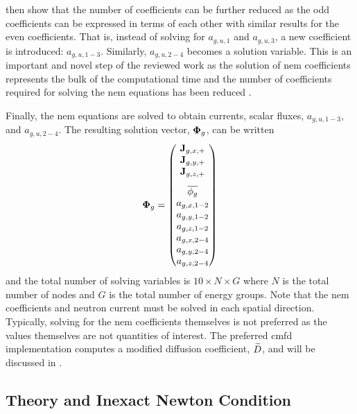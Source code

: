     \citeauthor{qe2paper} then show that the number of coefficients can be
    further reduced as the odd coefficients can be expressed in terms of
    each other with similar results for the even coefficients. That is,
    instead of solving for $a_{g,u,1}$ and $a_{g,u,3}$, a new coefficient is
    introduced: $a_{g,u,1-3}$. Similarly, $a_{g,u,2-4}$ becomes a solution
    variable. This is an important and novel step of the reviewed work as the
    solution of \gls{nem} coefficients represents the bulk of the
    computational time and the number of coefficients required for solving the
    \gls{nem} equations has been reduced \cite{qe2paper}.

    Finally, the \gls{nem} equations are solved to obtain currents, scalar
    fluxes, $a_{g,u,1-3}$, and $a_{g,u,2-4}$. The resulting solution vector,
    $\mathbf{\Phi}_g$, can be written 
    \begin{equation}
      \label{eq:solution_vector}
      \vPhi_g =
      \begin{pmatrix}
        \current_{g,x,+} \\
        \current_{g,y,+} \\
        \vspace{8pt}
        \current_{g,z,+} \\
        \overline{\phi_g} \\
        a_{g,x,1-2} \\
        a_{g,y,1-2} \\
        a_{g,z,1-2} \\
        a_{g,x,2-4} \\
        a_{g,y,2-4} \\
        a_{g,z,2-4}
      \end{pmatrix}
    \end{equation}
    and the total number of solving variables is $10 \times N \times G$ where
    $N$ is the total number of nodes and $G$ is the total number of energy
    groups. Note that the \gls{nem} coefficients and neutron current must be
    solved in each spatial direction. Typically, solving for the \gls{nem}
    coefficients themselves is not preferred as the values themselves are not
    quantities of interest.  The preferred \gls{cmfd} implementation computes
    a modified diffusion coefficient, $\widetilde{D}$, and will be discussed in
    .

  \subsection{ Theory and Inexact Newton Condition}
    \label{sec:jfnk_theory}

